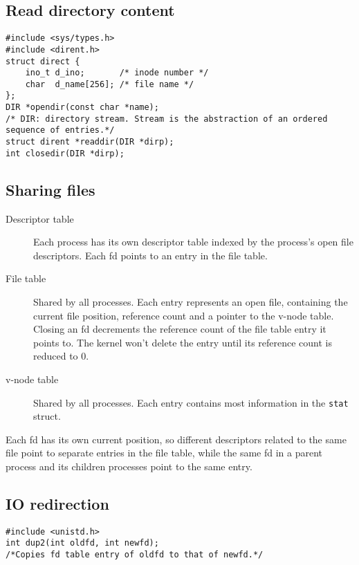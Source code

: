 \subsection{Read directory content}
\begin{lstlisting}[frame=single]
#include <sys/types.h>
#include <dirent.h>
struct direct {
	ino_t d_ino;       /* inode number */
	char  d_name[256]; /* file name */
};
DIR *opendir(const char *name);
/* DIR: directory stream. Stream is the abstraction of an ordered sequence of entries.*/ 
struct dirent *readdir(DIR *dirp);
int closedir(DIR *dirp);
\end{lstlisting}
\subsection{Sharing files}
\begin{description}
\item[Descriptor table] Each process has its own descriptor table indexed by the process's open file descriptors. Each fd points to an entry in the file table.
\item[File table]Shared by all processes. Each entry represents an open file, containing the current file position, reference count and a pointer to the v-node table. Closing an fd decrements the reference count of the file table entry it points to. The kernel won't delete the entry until its reference count is reduced to 0.
\item[v-node table]Shared by all processes. Each entry contains most information in the \texttt{stat} struct.
\end{description}
Each fd has its own current position, so different descriptors related to the same file point to separate entries in the file table, while the same fd in a parent process and its children processes point to the same entry.
\subsection{IO redirection}
\begin{lstlisting}[frame=single]
#include <unistd.h>
int dup2(int oldfd, int newfd);
/*Copies fd table entry of oldfd to that of newfd.*/
\end{lstlisting}
\ifx\PREAMBLE\undefined

\fi